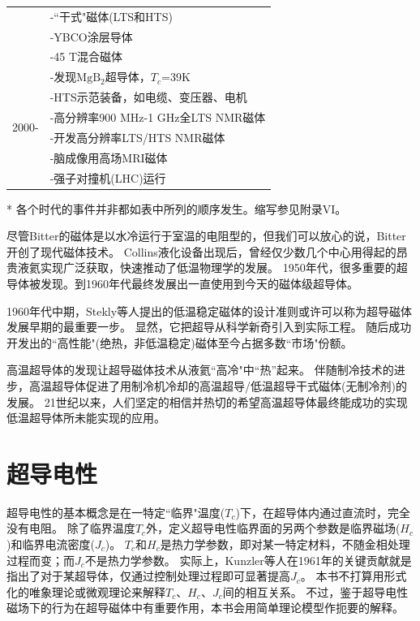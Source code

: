 \begin{table}[htbp]
\begin{threeparttable}
\begin{tabular}{ |c||l|}
 & -``干式"磁体(LTS和HTS)\\
 & -YBCO涂层导体\\
 & -45 T混合磁体\\
 \hline
  \multirow{6}{*}{2000-} & -发现$\mathrm{MgB_2}$超导体，$T_c$=39K \\
 & -HTS示范装备，如电缆、变压器、电机\\
 & -高分辨率900 MHz-1 GHz全LTS NMR磁体 \\
 & -开发高分辨率LTS/HTS NMR磁体\\
 & -脑成像用高场MRI磁体\\
 & -强子对撞机(LHC)运行\\
 \hline
\end{tabular}
 \begin{tablenotes}
        \footnotesize
        \item[*] 各个时代的事件并非都如表中所列的顺序发生。缩写参见附录VI。%
      \end{tablenotes}
    \end{threeparttable}
\end{table}

尽管Bitter的磁体是以水冷运行于室温的电阻型的，但我们可以放心的说，Bitter开创了现代磁体技术。
Collins液化设备出现后，曾经仅少数几个中心用得起的昂贵液氦实现广泛获取，快速推动了低温物理学的发展。
1950年代，很多重要的超导体被发现。到1960年代最终发展出一直使用到今天的磁体级超导体。

1960年代中期，Stekly等人提出的低温稳定磁体的设计准则或许可以称为超导磁体发展早期的最重要一步。
显然，它把超导从科学新奇引入到实际工程。
随后成功开发出的``高性能"(绝热，非低温稳定)磁体至今占据多数``市场"份额。

高温超导体的发现让超导磁体技术从液氦``高冷"中``热''起来。
伴随制冷技术的进步，高温超导体促进了用制冷机冷却的高温超导/低温超导干式磁体(无制冷剂)的发展。
21世纪以来，人们坚定的相信并热切的希望高温超导体最终能成功的实现低温超导体所未能实现的应用。

\section{超导电性}
超导电性的基本概念是在一特定``临界"温度($T_c$)下，在超导体内通过直流时，完全没有电阻。
除了临界温度$T_c$外，定义超导电性临界面的另两个参数是临界磁场($H_c$)和临界电流密度($J_c$)。
$T_c$和$H_c$是热力学参数，即对某一特定材料，不随金相处理过程而变；而$J_c$不是热力学参数。
实际上，Kunzler等人在1961年的关键贡献就是指出了对于某超导体，仅通过控制处理过程即可显著提高$J_c$。
本书不打算用形式化的唯象理论或微观理论来解释$T_c$、$H_c$、$J_c$间的相互关系。
不过，鉴于超导电性磁场下的行为在超导磁体中有重要作用，本书会用简单理论模型作扼要的解释。

